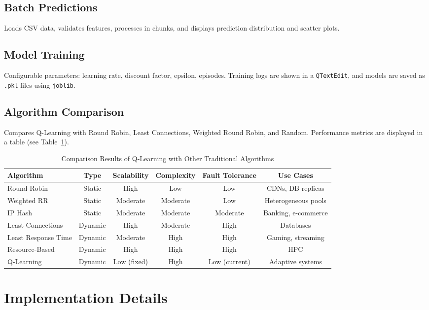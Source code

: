 \documentclass[runningheads]{llncs}
\begin{document}
\subsection{Batch Predictions}
Loads CSV data, validates features, processes in chunks, and displays prediction distribution and scatter plots.

\subsection{Model Training}
Configurable parameters: learning rate, discount factor, epsilon, episodes. Training logs are shown in a \texttt{QTextEdit}, and models are saved as \texttt{.pkl} files using \texttt{joblib}.

\subsection{Algorithm Comparison}
Compares Q-Learning with Round Robin, Least Connections, Weighted Round Robin, and Random. Performance metrics are displayed in a table (see Table~\ref{tab:comparison}).

\begin{table}[ht]
\caption{Comparison Results of Q-Learning with Other Traditional Algorithms}
\label{tab:comparison}
\centering
\begin{tabular}{lccccc}
\toprule
\textbf{Algorithm} & \textbf{Type} & \textbf{Scalability} & \textbf{Complexity} & \textbf{Fault Tolerance} & \textbf{Use Cases} \\
\midrule
Round Robin & Static & High & Low & Low & CDNs, DB replicas \\
Weighted RR & Static & Moderate & Moderate & Low & Heterogeneous pools \\
IP Hash & Static & Moderate & Moderate & Moderate & Banking, e-commerce \\
Least Connections & Dynamic & High & Moderate & High & Databases \\
Least Response Time & Dynamic & Moderate & High & High & Gaming, streaming \\
Resource-Based & Dynamic & High & High & High & HPC \\
Q-Learning & Dynamic & Low (fixed) & High & Low (current) & Adaptive systems \\
\bottomrule
\end{tabular}
\end{table}

\section{Implementation Details}
\end{document}
